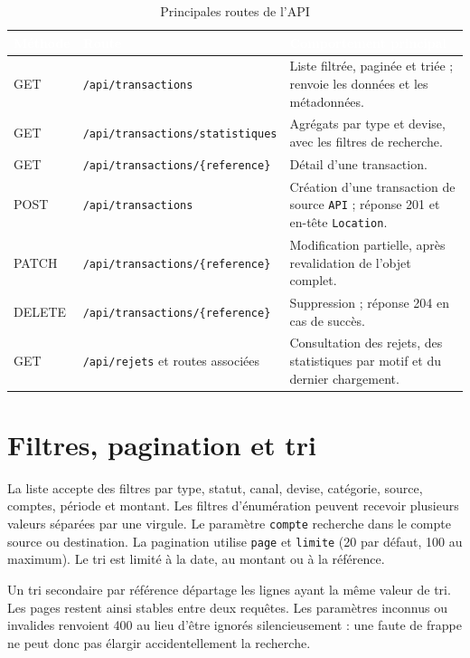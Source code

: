 \begin{table}[H]
\centering\small
\caption{Principales routes de l'API}
\label{tab:routes-api}
\begin{tabularx}{\linewidth}{|l|l|X|}
\hline
\rowcolor{bluedark}\textcolor{white}{\textbf{Méthode}} & \textcolor{white}{\textbf{Route}} & \textcolor{white}{\textbf{Comportement principal}} \\
\hline
GET & \texttt{/api/transactions} & Liste filtrée, paginée et triée ; renvoie les données et les métadonnées. \\
\hline
GET & \texttt{/api/transactions/statistiques} & Agrégats par type et devise, avec les filtres de recherche. \\
\hline
GET & \texttt{/api/transactions/\{reference\}} & Détail d'une transaction. \\
\hline
POST & \texttt{/api/transactions} & Création d'une transaction de source \texttt{API} ; réponse 201 et en-tête \texttt{Location}. \\
\hline
PATCH & \texttt{/api/transactions/\{reference\}} & Modification partielle, après revalidation de l'objet complet. \\
\hline
DELETE & \texttt{/api/transactions/\{reference\}} & Suppression ; réponse 204 en cas de succès. \\
\hline
GET & \texttt{/api/rejets} et routes associées & Consultation des rejets, des statistiques par motif et du dernier chargement. \\
\hline
\end{tabularx}
\end{table}

\section{Filtres, pagination et tri}
La liste accepte des filtres par type, statut, canal, devise, catégorie, source, comptes, période et
montant. Les filtres d'énumération peuvent recevoir plusieurs valeurs séparées par une virgule.
Le paramètre \texttt{compte} recherche dans le compte source ou destination. La pagination utilise
\texttt{page} et \texttt{limite} (20 par défaut, 100 au maximum). Le tri est limité à la date, au
montant ou à la référence.

Un tri secondaire par référence départage les lignes ayant la même valeur de tri. Les pages restent
ainsi stables entre deux requêtes. Les paramètres inconnus ou invalides renvoient 400 au lieu d'être
ignorés silencieusement : une faute de frappe ne peut donc pas élargir accidentellement la recherche.

